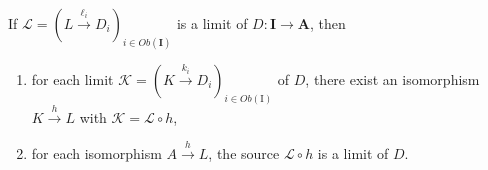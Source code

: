 \begin{prop}[Uniqueness]
If $\mathcal{L}=\left(L \xrightarrow{\ell_i} D_i\right)_{i \in O b(\mathbf{I})}$ is a limit of $D: \mathbf{I} \rightarrow \mathbf{A}$, then
    \begin{enumerate}
        \item for each limit $\mathcal{K}=\left(K \xrightarrow{k_i} D_i\right)_{i \in O b(\mathrm{I})}$ of $D$, there exist an isomorphism $K \xrightarrow{h} L$ with $\mathcal{K}=\mathcal{L} \circ h$,
        \item for each isomorphism $A \xrightarrow{h} L$, the source $\mathcal{L} \circ h$ is a limit of $D$.
    \end{enumerate}
\end{prop}






